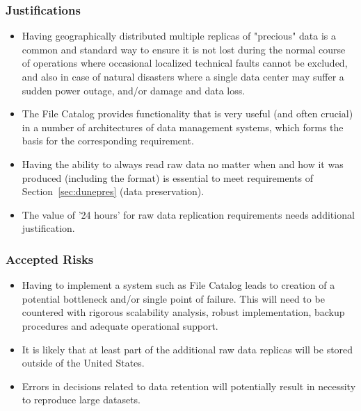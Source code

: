 \subsubsection{Justifications}
\begin{itemize}
\item Having geographically distributed multiple replicas of "precious" data is a common and standard way
to ensure it is not lost during the normal course of operations where occasional localized technical
faults cannot be excluded, and also in case of natural disasters where a single data center may suffer
a sudden power outage, and/or damage and data loss.

\item The File Catalog provides functionality that is very useful (and often crucial) in a number of architectures
of data management systems, which forms the basis for the corresponding requirement.

\item Having the ability to always read raw data no matter when and how it was produced (including the format)
is essential to meet requirements of Section~\ref{sec:dunepres} (data preservation).

\item The value of '24 hours' for raw data replication requirements needs additional justification. 
\end{itemize}

\subsubsection{Accepted Risks}
\begin{itemize}
\item Having to implement a system such as File Catalog leads to creation of a potential bottleneck
and/or single point of failure. This will need to be countered with rigorous scalability analysis,
robust implementation, backup procedures and adequate operational support.

\item It is likely that at least part of the additional raw data replicas will be stored outside of the United States.

\item Errors in decisions related to data retention will potentially result in necessity to reproduce large datasets.
\end{itemize}

